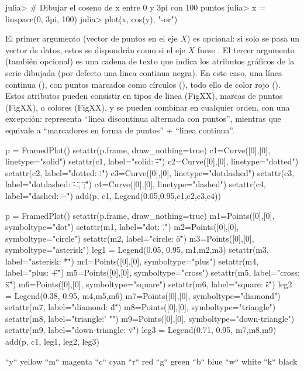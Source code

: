 \begin{jlconcode}
julia> # Dibujar el coseno de x entre 0 y 3pi con 100 puntos
julia> x = linspace(0, 3pi, 100)
julia> plot(x, cos(y), "-or")
\end{jlconcode}

El primer argumento (vector de puntos en el eje $X$) es opcional: si solo se pasa un vector de datos, estos se dispondrán como si el eje $X$ fuese \code{[1:length(y)]}. El tercer argumento (también opcional) es una cadena de texto que indica los atributos gráficos de la serie dibujada (por defecto una linea continua negra). En este caso, una línea continua (), con puntos marcados como círculos (), todo ello de color rojo (). Estos atributos pueden consistir en tipos de linea (FigXX), marcas de puntos (FigXX), o colores (FigXX), y se pueden combinar en cualquier orden, con una excepción:  representa ``linea discontinua alternada con puntos'', mientras que  equivale a ``marcadores en forma de puntos'' + ``linea continua''.

\begin{juliacode}
p = FramedPlot()
setattr(p.frame, draw_nothing=true)
c1=Curve([0],[0], linetype="solid")
setattr(c1, label="solid: \"-\"")
c2=Curve([0],[0], linetype="dotted")
setattr(c2, label="dotted: \":\"")
c3=Curve([0],[0], linetype="dotdashed")
setattr(c3, label="dotdashed: \"-.\", \";\"")
c4=Curve([0],[0], linetype="dashed")
setattr(c4, label="dashed: \"--\"")
add(p, c1, Legend(0.05,0.95,{c1,c2,c3,c4}))

p = FramedPlot()
setattr(p.frame, draw_nothing=true)
m1=Points([0],[0], symboltype="dot")
setattr(m1, label="dot: \".\"")
m2=Points([0],[0], symboltype="circle")
setattr(m2, label="circle: \"o\"")
m3=Points([0],[0], symboltype="asterisk")
leg1 = Legend(0.05, 0.95, {m1,m2,m3})
setattr(m3, label="asterisk: \"*\"")
m4=Points([0],[0], symboltype="plus")
setattr(m4, label="plus: \"+\"")
m5=Points([0],[0], symboltype="cross")
setattr(m5, label="cross: \"x\"")
m6=Points([0],[0], symboltype="square")
setattr(m6, label="square: \"s\"")
leg2 = Legend(0.38, 0.95, {m4,m5,m6})
m7=Points([0],[0], symboltype="diamond")
setattr(m7, label="diamond: \"d\"")
m8=Points([0],[0], symboltype="triangle")
setattr(m8, label="triangle: \"^^\"")
m9=Points([0],[0], symboltype="down-triangle")
setattr(m9, label="down-triangle: \"v\"")
leg3 = Legend(0.71, 0.95, {m7,m8,m9})
add(p, c1, leg1, leg2, leg3)

``y``     yellow
``m``     magenta
``c``     cyan
``r``     red
``g``     green
``b``     blue
``w``     white
``k``     black
\end{juliacode}

